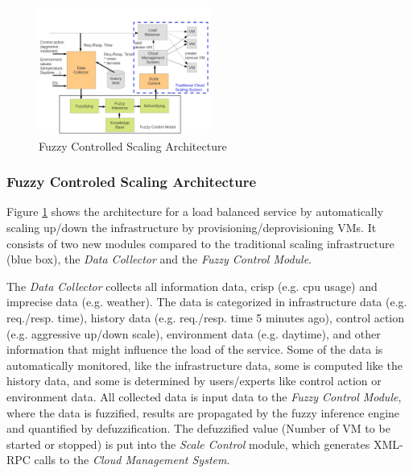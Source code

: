 
\begin{figure}[ht]
\begin{center}
\includegraphics[width=0.5\textwidth]{fig/architecture}
\end{center}
\caption{Fuzzy Controlled Scaling Architecture}
\label{fig:fuzzy_control_architecture}
\end{figure}

\subsubsection{Fuzzy Controled Scaling Architecture}\label{fuzzyScalingArchtecture}
Figure \ref{fig:fuzzy_control_architecture} shows the architecture for a load balanced service by automatically scaling up/down the infrastructure by provisioning/deprovisioning VMs. It consists of two new modules compared to the traditional scaling infrastructure (blue box), the \textit{Data Collector} and the \textit{Fuzzy Control Module}.

The \textit{Data Collector} collects all information data, crisp (e.g. cpu usage) and imprecise data (e.g. weather). The data is categorized in infrastructure data (e.g. req./resp. time), history data (e.g. req./resp. time 5 minutes ago), control action (e.g. aggressive up/down scale), environment data (e.g. daytime), and other information that might influence the load of the service.  Some of the data is automatically monitored, like the infrastructure data, some is computed like the history data, and some is determined by users/experts like control action or environment data. 
All collected data is input data to the \textit{Fuzzy Control Module}, where the data is fuzzified, results are propagated by the fuzzy inference engine and quantified by defuzzification. The defuzzified value (Number of VM to be started or stopped) is put into the \textit{Scale Control} module, which generates XML-RPC calls to the \textit{Cloud Management System}.

